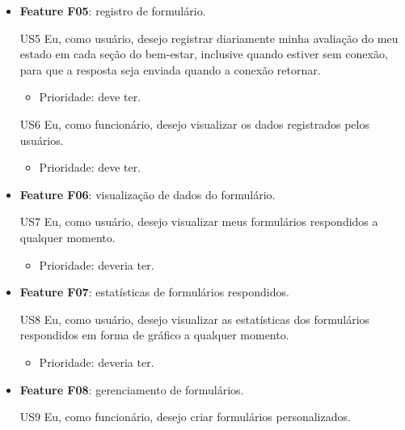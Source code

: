 

\begin{itemize}

    \item \textbf{Feature F05}: registro de formulário.

    US5 Eu, como usuário, desejo registrar diariamente minha avaliação do meu estado em cada seção do bem-estar, inclusive quando estiver sem conexão, para que a resposta seja enviada quando a conexão retornar.

    \begin{itemize}
        \item Prioridade: deve ter.
    \end{itemize}
    
    US6 Eu, como funcionário, desejo visualizar os dados registrados pelos usuários.

    \begin{itemize}
        \item Prioridade: deve ter.
    \end{itemize}
    
    \item \textbf{Feature F06}: visualização de dados do formulário.

    US7 Eu, como usuário, desejo visualizar meus formulários respondidos a qualquer momento.

    \begin{itemize}
        \item Prioridade: deveria ter.
    \end{itemize}
    
    \item \textbf{Feature F07}: estatísticas de formulários respondidos.

    US8 Eu, como usuário, desejo visualizar as estatísticas dos formulários respondidos em forma de gráfico a qualquer momento.

    \begin{itemize}
        \item Prioridade: deveria ter.
    \end{itemize}
    
    \item \textbf{Feature F08}: gerenciamento de formulários.

    US9 Eu, como funcionário, desejo criar formulários personalizados.


\end{itemize}
